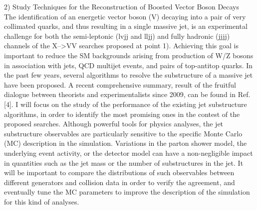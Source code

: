 \documentclass[10pt, a4paper]{article}
\begin{document}
2) Study Techniques for the Reconstruction of Boosted Vector Boson Decays\\
The identification of an energetic vector boson (V) decaying into a pair of 
very collimated quarks, and thus resulting in a single massive jet, is an experimental 
challenge for both the semi-leptonic (lvjj and lljj) and fully hadronic (jjjj) channels 
of the X-->VV searches proposed at point 1). Achieving this goal is important 
to reduce the SM backgrounds arising from production of W/Z bosons in 
association with jets, QCD multijet events, and pairs of top-antitop quarks.
In the past few years, several algorithms to resolve the substructure 
of a massive jet have been proposed. 
A recent comprehensive summary, result of the fruitful dialogue 
between theorists and experimentalists since 2009, can be found in Ref. [4]. 
I will focus on the study of the performance 
of the existing jet substructure algorithms, in order to identify the 
most promising ones in the contest of the proposed searches. 
Although powerful tools for physics analyses, 
the jet substructure observables are particularly sensitive 
to the specific Monte Carlo (MC) description in the simulation. 
Variations in the parton shower model, the underlying event 
activity, or the detector model can have a non-negligible impact 
in quantities such as the jet mass or the number of substructures in the jet. 
It will be important to compare the distributions of such observables 
between different generators and collision data in order to verify the agreement, 
and eventually tune the MC parameters to improve the description
of the simulation for this kind of analyses.\\
\end{document}
